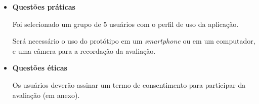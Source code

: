 \begin{itemize}
	   \item \textbf{Questões práticas}
	      
	      \subitem Foi selecionado um grupo de 5 usuários com o perfil de uso da aplicação.
	      
	      \subitem Será necessário o uso do protótipo em um \textit{smartphone} ou em um computador, e uma câmera para 
	      a recordação da avaliação.
	      
	   \item \textbf{Questões éticas}
	      
	      \subitem 
		Os usuários deverão assinar um termo de consentimento para participar da avaliação (em anexo).
	      
	  \end{itemize}
	
	